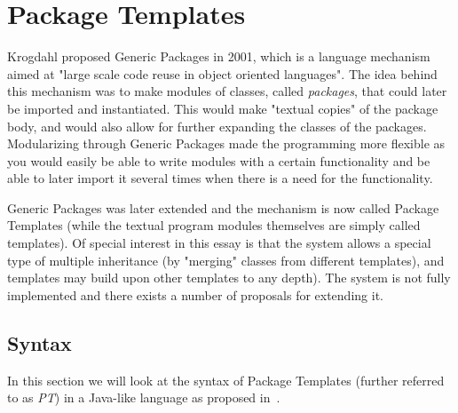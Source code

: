 \section{Package Templates}\label{sec:package-templates}


Krogdahl proposed Generic Packages in 2001, which is a language mechanism aimed at "large scale code reuse in object oriented languages"\cite{krogdahl:GP}.
The idea behind this mechanism was to make modules of classes, called \textit{packages}, that could later be imported and instantiated.
This would make "textual copies" of the package body, and would also allow for further expanding the classes of the packages.
Modularizing through Generic Packages made the programming more flexible as you would easily be able to write modules with a certain functionality and be able to later import it several times when there is a need for the functionality.

Generic Packages was later extended  and the mechanism is now called Package Templates (while the textual program modules themselves are simply called templates).
Of special interest in this essay is that the system allows a special type of multiple inheritance (by "merging" classes from different templates), and templates may build upon other templates to any depth).
The system is not fully implemented and there exists a number of proposals for extending it.

\subsection{Syntax}\label{subsec:syntax}

In this section we will look at the syntax of Package Templates (further referred to as \emph{PT}) in a Java-like language as proposed in~\cite{jot}.

